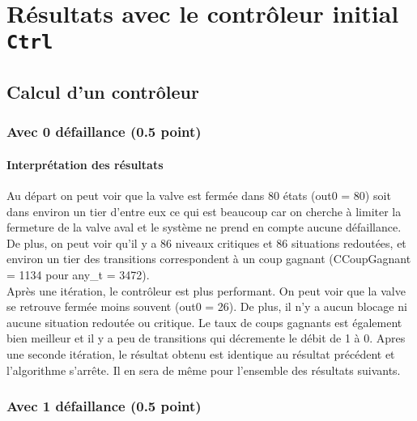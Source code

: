 \documentclass[a4paper]{book}
\begin{document}
\section{Résultats avec le contrôleur initial {\tt Ctrl}}
\subsection{Calcul d'un contrôleur}
\subsubsection{Avec 0 défaillance (0.5 point)}



%
%
\paragraph{Interprétation des résultats}
Au départ on peut voir que la valve est fermée dans 80 états (out0 = 80) 
soit dans environ un tier d'entre eux ce qui est beaucoup car on cherche à limiter la fermeture de la valve aval et le système ne prend en compte aucune défaillance. 
De plus, on peut voir qu'il y a 86 niveaux critiques et 86 situations redoutées, et environ un tier des transitions correspondent à un coup gagnant (CCoupGagnant = 1134 pour any\_t = 3472).\\
Après une itération, le contrôleur est plus performant. On peut voir que la valve se retrouve fermée moins souvent (out0 = 26). De plus, il n'y a aucun blocage 
ni aucune situation redoutée ou critique. Le taux de coups gagnants est également bien meilleur et il y a peu de transitions qui décremente le débit de 1 à 0.
Apres une seconde itération, le résultat obtenu est identique au résultat précédent et l'algorithme s'arrête. Il en sera de même pour l'ensemble des résultats suivants.


\subsubsection{Avec 1 défaillance (0.5 point)}




%
\end{document}
